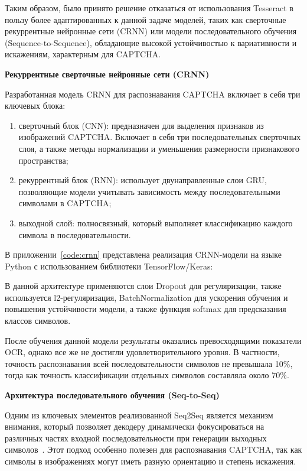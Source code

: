 Таким образом, было принято решение отказаться от использования Tesseract в 
пользу более адаптированных к данной задаче моделей, таких как сверточные 
рекуррентные нейронные сети (CRNN) или модели последовательного обучения 
(Sequence-to-Sequence), обладающие высокой устойчивостью к вариативности и 
искажениям, характерным для CAPTCHA.

\textbf{Рекуррентные сверточные нейронные сети (CRNN)}

Разработанная модель CRNN для распознавания CAPTCHA включает в себя три ключевых 
блока:
\begin{enumerate}
    \item сверточный блок (CNN): предназначен для выделения признаков из 
    изображений CAPTCHA. Включает в себя три последовательных сверточных слоя, а 
    также методы нормализации и уменьшения размерности признакового пространства;
    \item рекуррентный блок (RNN): использует двунаправленные слои GRU, 
    позволяющие модели учитывать зависимость между последовательными символами в 
    CAPTCHA;
    \item выходной слой: полносвязный, который выполняет классификацию каждого 
    символа в последовательности.
\end{enumerate}

В приложении~\ref{code:crnn} представлена реализация CRNN-модели на языке Python 
с использованием библиотеки TensorFlow/Keras:

В данной архитектуре применяются слои Dropout для регуляризации, также 
используется l2-регуляризация, BatchNormalization для ускорения обучения и 
повышения устойчивости модели, а также функция softmax для предсказания классов 
символов.

После обучения данной модели результаты оказались превосходящими показатели OCR, 
однако все же не достигли удовлетворительного уровня. В частности, точность 
распознавания всей последовательности символов не превышала 10\%, тогда как 
точность классификации отдельных символов составляла около 70\%.

\textbf{Архитектура последовательного обучения (Seq-to-Seq)}

Одним из ключевых элементов реализованной Seq2Seq является механизм внимания, 
который позволяет декодеру динамически фокусироваться на различных частях входной 
последовательности при генерации выходных символов~\cite{Seq2SeqBook}. Этот 
подход особенно полезен для распознавания CAPTCHA, так как символы в изображениях 
могут иметь разную ориентацию и степень искажения.

